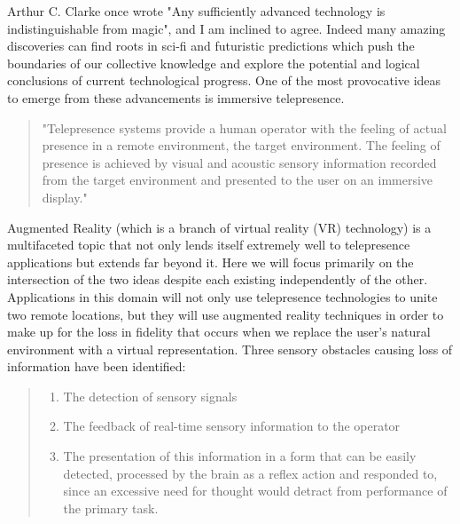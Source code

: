 \documentclass[a4paper,12pt]{report}
\begin{document}
Arthur C. Clarke once wrote "Any sufficiently advanced technology is indistinguishable from magic", and I am inclined to agree. Indeed many amazing discoveries can find roots in sci-fi and futuristic predictions which push the boundaries of our collective knowledge and explore the potential and logical conclusions of current technological progress. One of the most provocative ideas to emerge from these advancements is immersive telepresence. 
	\begin{flushright}
		\cite{0001}
	\end{flushright}

\begin{quotation}
"Telepresence systems provide a human operator with the feeling of actual presence in a remote environment, the target environment. The feeling of presence is achieved by visual and acoustic sensory information recorded from the target environment and presented to the user on an immersive display."
	\begin{flushright}
		\cite{6094998}
	\end{flushright}
\end{quotation}
\iffalse
Augmented Reality (which is a branch of virtual reality (VR) technology) is a multifaceted topic that not only lends itself extremely well to telepresence applications but extends far beyond it. Here we will focus primarily on the intersection of the two ideas despite each existing independently of the other. Applications in this domain will not only use telepresence technologies to unite two remote locations, but they will use augmented reality techniques in order to make up for the loss in fidelity that occurs when we replace the user's natural environment with a virtual representation. Three sensory obstacles causing loss of information have been identified:
\begin{quote}

	\begin{enumerate}
		\item The detection of sensory signals
		\item The feedback of real-time sensory information to the operator
		\item The presentation of this information in a form that can be easily detected, processed by the brain as a reflex action and responded to, since an excessive need for thought would detract from performance of the primary task.
	\end{enumerate}
	\begin{flushright}
		\cite{540147}
	\end{flushright}
\end{quote}
\end{document}

